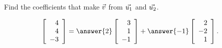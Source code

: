\documentclass{ximera}
\author{Zack Reed}
\begin{document}
\begin{exercise}
  Find the coefficients that make $\vec{v}$ from $\vec{u_1}$ and $\vec{u_2}$.
  
  \begin{equation*}
    \startmat{r}
      4 \\
      4 \\
      -3
    \stopmat
    =
    \answer{2}
    \startmat{r}
      3 \\
      1 \\
      -1
    \stopmat
    + \answer{-1}
    \startmat{r}
      2 \\
      -2 \\
      1
    \stopmat.
  \end{equation*}
  
\end{exercise}
\end{document}
